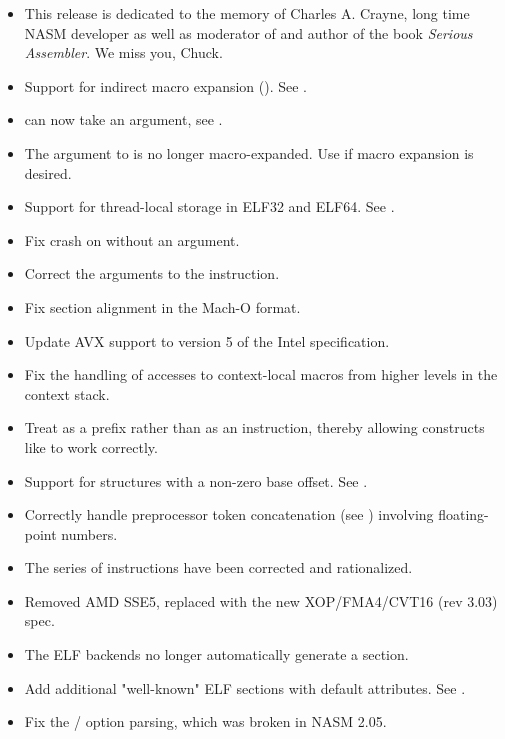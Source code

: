 \begin{itemize}
    \item{This release is dedicated to the memory of Charles A. Crayne, long
        time NASM developer as well as moderator of  and
        author of the book \emph{Serious Assembler}. We miss you, Chuck.}
    \item{Support for indirect macro expansion (\code{\%[...]}). See .}
    \item{ can now take an argument, see .}
    \item{The argument to  is no longer macro-expanded. Use
        \code{\%[...]} if macro expansion is desired.}
    \item{Support for thread-local storage in ELF32 and ELF64. See .}
    \item{Fix crash on  without an argument.}
    \item{Correct the arguments to the  instruction.}
    \item{Fix section alignment in the Mach-O format.}
    \item{Update AVX support to version 5 of the Intel specification.}
    \item{Fix the handling of accesses to context-local macros from higher
        levels in the context stack.}
    \item{Treat  as a prefix rather than as an instruction, thereby
        allowing constructs like  to work correctly.}
    \item{Support for structures with a non-zero base offset. See .}
    \item{Correctly handle preprocessor token concatenation (see )
        involving floating-point numbers.}
    \item{The  series of instructions have been corrected and rationalized.}
    \item{Removed AMD SSE5, replaced with the new XOP/FMA4/CVT16 (rev 3.03) spec.}
    \item{The ELF backends no longer automatically generate a  section.}
    \item{Add additional "well-known" ELF sections with default attributes. See .}
\end{itemize}


\begin{itemize}
    \item{Fix the / option parsing, which was broken in NASM 2.05.}
\end{itemize}

